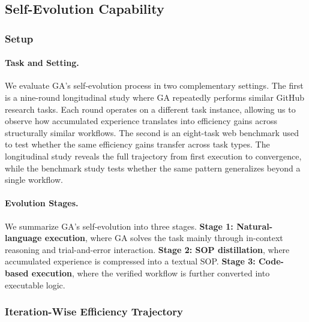 \subsection{Self-Evolution Capability}
\label{sec:self_evolution_capability}

\subsubsection{Setup}
\label{sec:exp_selfevolution_setup}

\paragraph{Task and Setting.}
We evaluate GA's self-evolution process in two complementary settings. The first is a nine-round longitudinal study where GA repeatedly performs similar GitHub research tasks. Each round operates on a different task instance, allowing us to observe how accumulated experience translates into efficiency gains across structurally similar workflows. The second is an eight-task web benchmark used to test whether the same efficiency gains transfer across task types. The longitudinal study reveals the full trajectory from first execution to convergence, while the benchmark study tests whether the same pattern generalizes beyond a single workflow.

\paragraph{Evolution Stages.}
We summarize GA's self-evolution into three stages. \textbf{Stage 1: Natural-language execution}, where GA solves the task mainly through in-context reasoning and trial-and-error interaction. \textbf{Stage 2: SOP distillation}, where accumulated experience is compressed into a textual SOP. \textbf{Stage 3: Code-based execution}, where the verified workflow is further converted into executable logic.

\subsubsection{Iteration-Wise Efficiency Trajectory}
\label{sec:exp_iteration_trajectory}

